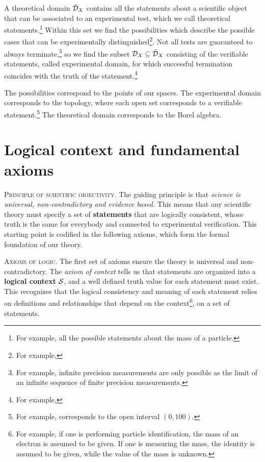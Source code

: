 \documentclass[10pt,twocolumn, nofootinbib]{revtex4-2}
\newcommand\partitle[1]{\textsc{#1}.}
\begin{document}
A theoretical domain $\bar{\mathcal{D}}_X$ contains all the statements about a scientific object that can be associated to an experimental test, which we call theoretical statements.\footnote{For example, all the possible statements about the mass of a particle.} Within this set we find the possibilities which describe the possible cases that can be experimentally distinguished\footnote{For example, }. Not all tests are guaranteed to always terminate,\footnote{For example, infinite precision measurements are only possible as the limit of an infinite sequence of finite precision measurements.} so we find the subset $\mathcal{D}_X \subseteq \bar{\mathcal{D}}_X$ consisting of the verifiable statements, called experimental domain, for which successful termination coincides with the truth of the statement.\footnote{For example, }

The possibilities correspond to the points of our spaces. The experimental domain corresponds to the topology, where each open set corresponds to a verifiable statement.\footnote{For example,  corresponds to the open interval $(0, 100)$.} The theoretical domain corresponds to the Borel algebra.


\section{Logical context and fundamental axioms}

\partitle{Principle of scientific objectivity} The guiding principle is that \emph{science is universal, non-contradictory and evidence based.} This means that any scientific theory must specify a set of \textbf{statements} that are logically consistent, whose truth is the same for everybody and connected to experimental verification. This starting point is codified in the following axioms, which form the formal foundation of our theory.

\partitle{Axioms of logic} The first set of axioms ensure the theory is universal and non-contradictory. The \emph{axiom of context} tells us that statements are organized into a \textbf{logical context} $\mathcal{S}$, and a well defined truth value for each statement must exist. This recognizes that the logical consistency and meaning of each statement relies on definitions and relationships that depend on the context\footnote{For example, if one is performing particle identification, the mass of an electron is assumed to be given. If one is measuring the mass, the identity is assumed to be given, while the value of the mass is unknown.}, on a set of statements.
\end{document}
